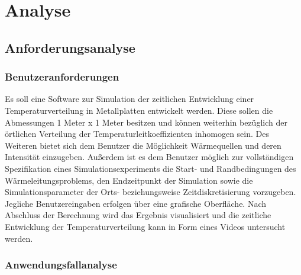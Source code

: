 \chapter{Analyse}
\section{Anforderungsanalyse}

\subsection{Benutzeranforderungen}

Es soll eine Software zur Simulation der zeitlichen Entwicklung einer Temperaturverteilung in Metallplatten entwickelt werden. Diese sollen die Abmessungen 1 Meter x 1 Meter besitzen und können weiterhin bezüglich der örtlichen Verteilung der Temperaturleitkoeffizienten inhomogen sein. Des Weiteren bietet sich dem Benutzer die Möglichkeit Wärmequellen und deren Intensität einzugeben. Außerdem ist es dem Benutzer möglich zur vollständigen Spezifikation eines Simulationsexperiments die Start- und Randbedingungen des Wärmeleitungsproblems, den Endzeitpunkt der Simulation sowie die Simulationsparameter der Orts- beziehungsweise Zeitdiskretisierung vorzugeben. Jegliche Benutzereingaben erfolgen über eine grafische Oberfläche. Nach Abschluss der Berechnung wird das Ergebnis visualisiert und die zeitliche Entwicklung der Temperaturverteilung kann in Form eines Videos untersucht werden.


\subsection{Anwendungsfallanalyse} \label{Kapitel Use Case Analyse}

